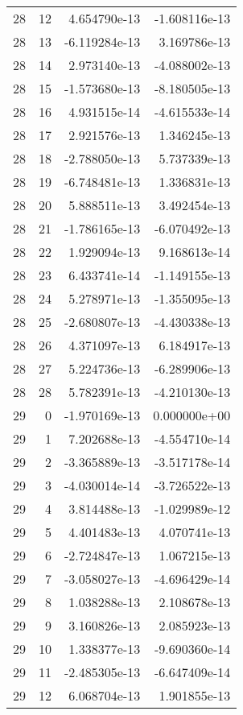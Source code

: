 \begin{tabular}{rrrr}
  28 &   12 &  4.654790e-13 & -1.608116e-13 \\
  28 &   13 & -6.119284e-13 &  3.169786e-13 \\
  28 &   14 &  2.973140e-13 & -4.088002e-13 \\
  28 &   15 & -1.573680e-13 & -8.180505e-13 \\
  28 &   16 &  4.931515e-14 & -4.615533e-14 \\
  28 &   17 &  2.921576e-13 &  1.346245e-13 \\
  28 &   18 & -2.788050e-13 &  5.737339e-13 \\
  28 &   19 & -6.748481e-13 &  1.336831e-13 \\
  28 &   20 &  5.888511e-13 &  3.492454e-13 \\
  28 &   21 & -1.786165e-13 & -6.070492e-13 \\
  28 &   22 &  1.929094e-13 &  9.168613e-14 \\
  28 &   23 &  6.433741e-14 & -1.149155e-13 \\
  28 &   24 &  5.278971e-13 & -1.355095e-13 \\
  28 &   25 & -2.680807e-13 & -4.430338e-13 \\
  28 &   26 &  4.371097e-13 &  6.184917e-13 \\
  28 &   27 &  5.224736e-13 & -6.289906e-13 \\
  28 &   28 &  5.782391e-13 & -4.210130e-13 \\
  29 &    0 & -1.970169e-13 &  0.000000e+00 \\
  29 &    1 &  7.202688e-13 & -4.554710e-14 \\
  29 &    2 & -3.365889e-13 & -3.517178e-14 \\
  29 &    3 & -4.030014e-14 & -3.726522e-13 \\
  29 &    4 &  3.814488e-13 & -1.029989e-12 \\
  29 &    5 &  4.401483e-13 &  4.070741e-13 \\
  29 &    6 & -2.724847e-13 &  1.067215e-13 \\
  29 &    7 & -3.058027e-13 & -4.696429e-14 \\
  29 &    8 &  1.038288e-13 &  2.108678e-13 \\
  29 &    9 &  3.160826e-13 &  2.085923e-13 \\
  29 &   10 &  1.338377e-13 & -9.690360e-14 \\
  29 &   11 & -2.485305e-13 & -6.647409e-14 \\
  29 &   12 &  6.068704e-13 &  1.901855e-13 \\

\end{tabular}
